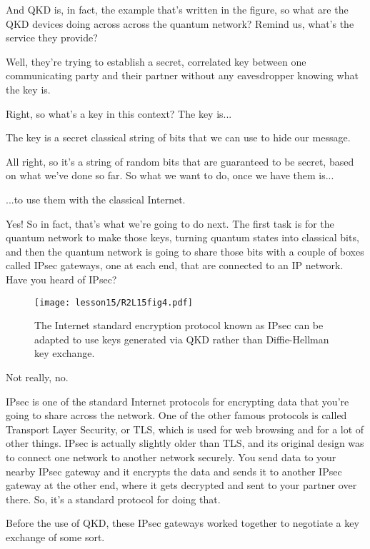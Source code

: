 \rrr And QKD is, in fact, the example that's written in the figure, so what are the QKD devices doing across across the quantum network? Remind us, what's the service they provide?

\mmm Well, they're trying to establish a secret, correlated key between one communicating party and their partner without any eavesdropper knowing what the key is.

\rrr Right, so what's a key in this context? The key is...

\mmm The key is a secret classical string of bits that we can use to hide our message.

\rrr All right, so it's a string of random bits that are guaranteed to be secret, based on what we've done so far. So what we want to do, once we have them is...

\mmm ...to use them with the classical Internet.

\rrr Yes! So in fact, that's what we're going to do next. The first task is for the quantum network to make those keys, turning quantum states into classical bits, and then the quantum network is going to share those bits with a couple of boxes called IPsec gateways, one at each end, that are connected to an IP network. Have you heard of IPsec?

\begin{figure}[t]
    \centering
    \texttt{[image: lesson15/R2L15fig4.pdf]}
    \caption[IPsec with QKD]{The Internet standard encryption protocol known as IPsec can be adapted to use keys generated via QKD rather than Diffie-Hellman key exchange.}
    \label{fig:15-4-ipsec-with-qkd}
\end{figure}

\mmm Not really, no.

\rrr IPsec is one of the standard Internet protocols for encrypting data that you're going to share across the network. One of the other famous protocols is called Transport Layer Security, or TLS, which is used for web browsing and for a lot of other things. IPsec is actually slightly older than TLS, and its original design was to connect one network to another network securely. You send data to your nearby IPsec gateway and it encrypts the data and sends it to another IPsec gateway at the other end, where it gets decrypted and sent to your partner over there. So, it's a standard protocol for doing that.

Before the use of QKD, these IPsec gateways worked together to negotiate a key exchange of some sort.

